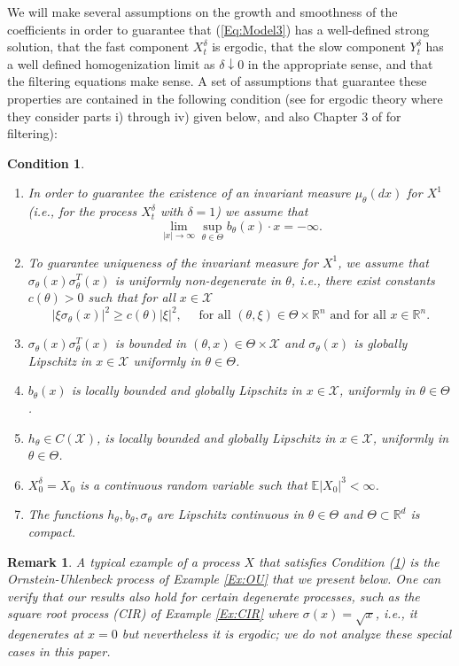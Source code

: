 \documentclass{article}
\newtheorem{remark}{ Remark}
\newtheorem{condition}{Condition}[section]
\begin{document}
We will make several assumptions on the growth and smoothness of the coefficients in order to guarantee that (\ref{Eq:Model3}) has a well-defined strong solution, that the fast component $X_t^\delta$ is ergodic, that the slow component $Y_t^\delta$ has a well defined homogenization limit as $\delta\downarrow 0$ in the appropriate sense, and that the filtering equations make sense. A set of assumptions that guarantee these properties are contained in the following condition (see \cite{PardouxVeretennikov2} for ergodic theory where they consider parts i) through iv) given below, and also Chapter 3 of \cite{bainCrisan} for filtering):
\begin{condition}\label{A:Assumption1}
\begin{enumerate}
\item{In order to guarantee the existence of an invariant measure $\mu_{\theta}(dx)$ for $X^1$ (i.e., for the process $X_{t}^{\delta}$ with $\delta=1$) we assume that
\[
\lim_{|x|\rightarrow\infty}\sup_{\theta\in\Theta} b_{\theta}(x)\cdot x=-\infty.
\]
}
\item{To guarantee uniqueness of the invariant measure for $X^1$, we assume that $\sigma_{\theta}(x)\sigma_{\theta}^{T}(x)$ is uniformly non-degenerate in $\theta$, i.e., there exist constants $c(\theta)>0$ such that for all $x\in\mathcal{X}$
\[
\left|\xi\sigma_{\theta}(x)\right|^{2}\geq c(\theta)|\xi|^{2},\quad\textrm{ for all $(\theta,\xi)\in\Theta\times\mathbb{R}^{n}$ and for all $x\in\mathbb R^n$}.
\]}
\item{$\sigma_{\theta}(x)\sigma_{\theta}^{T}(x)$ is bounded  in $(\theta,x)\in\Theta\times\mathcal{X}$ and $\sigma_{\theta}(x)$ is globally Lipschitz in $x\in\mathcal{X}$ uniformly in $\theta\in\Theta$.}
\item{$b_{\theta}(x)$ is locally bounded and globally Lipschitz in $x\in\mathcal{X}$, uniformly in $\theta\in\Theta$.}
\item{$h_{\theta}\in C(\mathcal{X})$, is locally bounded and globally Lipschitz in $x\in\mathcal{X}$, uniformly in $\theta\in\Theta$.}
\item{$X^{\delta}_{0}=X_{0}$ is a continuous random variable such that $\mathbb{E}|X_{0}|^{3}<\infty$.}
\item{The functions $h_{\theta},b_{\theta},\sigma_{\theta}$ are Lipschitz continuous in $\theta\in\Theta$ and $\Theta \subset\mathbb{R}^{d}$ is compact.}
\end{enumerate}
\end{condition}
\begin{remark}\label{R:RelaxedAssumptions}
A typical example of a process $X$ that satisfies Condition (\ref{A:Assumption1}) is the Ornstein-Uhlenbeck process of Example \ref{Ex:OU} that we present below. One can verify that our results also hold for certain degenerate processes, such as the square root process (CIR) of Example \ref{Ex:CIR} where $\sigma(x)=\sqrt{x}$, i.e., it  degenerates at $x=0$ but nevertheless it is ergodic; we do not analyze these special cases in this paper.
\end{remark}
\end{document}
